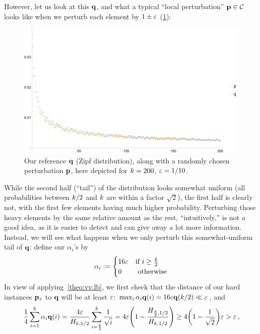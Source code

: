 However, let us look at this $\mathbf{q}$, and what a typical ``local perturbation'' $\mathbf{p}\in\mathcal{C}$ looks like when we perturb each element by $1\pm\varepsilon$ (\cref{fig:vv17:lb:zipf}):
\begin{figure}[H]
	\includegraphics[width=1.0\textwidth]{figures/fig-lowerbound-zipf-pq}
	\caption{\label{fig:vv17:lb:zipf}Our reference $\mathbf{q}$ (Zipf distribution), along with a randomly chosen perturbation $\mathbf{p}$, here depicted for $k=200$, $\varepsilon=1/10$.}
\end{figure}
While the second half (``tail'') of the distribution looks somewhat uniform (all probabilities between $k/2$ and $k$ are within a factor $\sqrt{2}$), the first half is clearly not, with the first few elements having much higher probability. Perturbing those heavy elements by the same relative amount as the rest, ``intuitively,'' is not a good idea, as it is easier to detect and can give away a lot more information. Instead, we will see what happens when we only perturb this somewhat-uniform tail of $\mathbf{q}$: define our $\alpha_i$'s by
\[
	\alpha_i := 
	\begin{cases}
		16\varepsilon &\text{if } i \geq \frac{k}{2}\\
		0 &\text{ otherwise}
	\end{cases}
\]
In view of applying~\cref{theo:vv:lb}, we first check that the distance of our hard instances $\mathbf{p}_z$ to $\mathbf{q}$ will be at least $\varepsilon$:
$
\max_{i} \alpha_i\mathbf{q}(i) = 16\varepsilon\mathbf{q}(k/2) \ll \varepsilon
$, and
\[
	\frac{1}{4}\sum_{i=1}^\ab \alpha_i\q(i) = 	\frac{4\dst}{H_{\ab,1/2}} \sum_{i=\frac{\ab}{2}}^\ab \frac{1}{\sqrt{i}} = 4\dst\Paren{1-\frac{H_{\frac{\ab}{2},1/2}}{H_{\ab,1/2}}} \geq 4\Paren{1-\frac{1}{\sqrt{2}}}\dst > \dst\,,
\]
